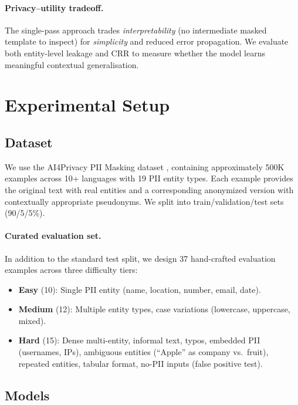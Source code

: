 \documentclass[11pt,a4paper]{article}
\begin{document}
\paragraph{Privacy--utility tradeoff.}
The single-pass approach trades \emph{interpretability} (no intermediate
masked template to inspect) for \emph{simplicity} and reduced error
propagation.  We evaluate both entity-level leakage and CRR to measure
whether the model learns meaningful contextual generalisation.

\section{Experimental Setup}
\label{sec:experiments}

\subsection{Dataset}

We use the AI4Privacy PII Masking dataset \cite{ai4privacy2024}, containing
approximately 500K examples across 10+ languages with 19 PII entity types.
Each example provides the original text with real entities and a corresponding
anonymized version with contextually appropriate pseudonyms.  We split into
train/validation/test sets (90/5/5\%).

\paragraph{Curated evaluation set.}
In addition to the standard test split, we design 37 hand-crafted evaluation
examples across three difficulty tiers:
\begin{itemize}
    \item \textbf{Easy} (10): Single PII entity (name, location, number, email, date).
    \item \textbf{Medium} (12): Multiple entity types, case variations (lowercase, uppercase, mixed).
    \item \textbf{Hard} (15): Dense multi-entity, informal text, typos, embedded PII (usernames, IPs), ambiguous entities (``Apple'' as company vs.\ fruit), repeated entities, tabular format, no-PII inputs (false positive test).
\end{itemize}

\subsection{Models}
\end{document}
